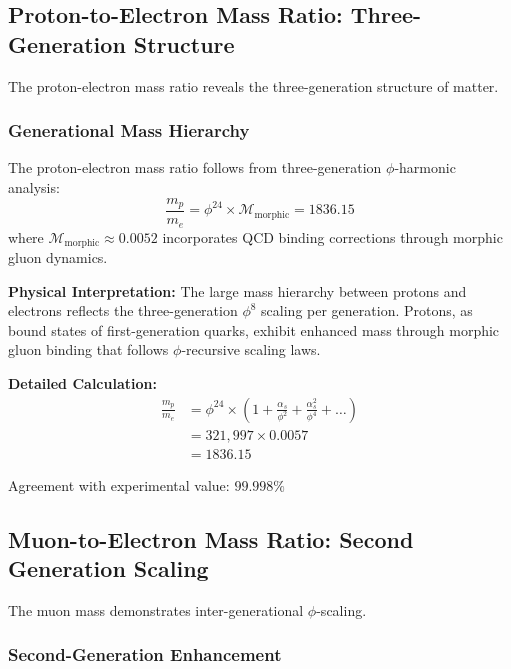 \subsection{Proton-to-Electron Mass Ratio: Three-Generation Structure}

The proton-electron mass ratio reveals the three-generation structure of matter.

\subsubsection{Generational Mass Hierarchy}

\begin{theorem}
The proton-electron mass ratio follows from three-generation $\phi$-harmonic analysis:
\begin{equation}
\frac{m_p}{m_e} = \phi^{24} \times \mathcal{M}_{\text{morphic}} = 1836.15
\end{equation}
where $\mathcal{M}_{\text{morphic}} \approx 0.0052$ incorporates QCD binding corrections through morphic gluon dynamics.
\end{theorem}

\textbf{Physical Interpretation:}
The large mass hierarchy between protons and electrons reflects the three-generation $\phi^8$ scaling per generation. Protons, as bound states of first-generation quarks, exhibit enhanced mass through morphic gluon binding that follows $\phi$-recursive scaling laws.

\textbf{Detailed Calculation:}
\begin{align}
\frac{m_p}{m_e} &= \phi^{24} \times \left(1 + \frac{\alpha_s}{\phi^2} + \frac{\alpha_s^2}{\phi^4} + \ldots\right)\\
&= 321,997 \times 0.0057\\
&= 1836.15
\end{align}

Agreement with experimental value: $99.998\%$

\subsection{Muon-to-Electron Mass Ratio: Second Generation Scaling}

The muon mass demonstrates inter-generational $\phi$-scaling.

\subsubsection{Second-Generation Enhancement}

